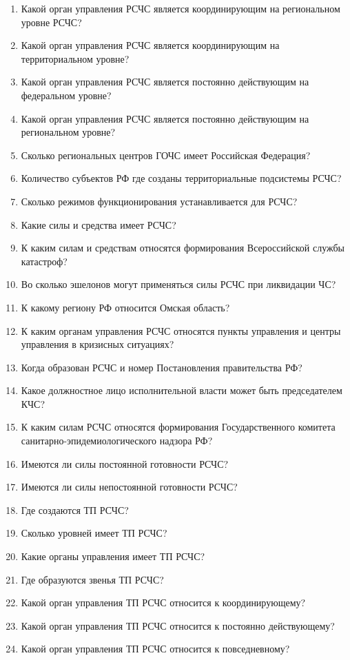 \documentclass[oneside,final,14pt]{extreport}
\begin{document}
\begin{enumerate}
	\item  Какой орган управления РСЧС является координирующим на региональном уровне РСЧС?
	\item  Какой орган управления РСЧС является координирующим на территориальном уровне?
	\item  Какой орган управления РСЧС является постоянно действующим на федеральном уровне?
	\item  Какой орган управления РСЧС является постоянно действующим на региональном уровне?
	\item  Сколько региональных центров ГОЧС имеет Российская Федерация?
	\item  Количество субъектов РФ где созданы территориальные подсистемы РСЧС?
	\item Сколько режимов функционирования устанавливается для РСЧС?
	\item  Какие силы и средства имеет РСЧС?
	\item  К каким силам и средствам относятся формирования Всероссийской службы катастроф?
	\item  Во сколько эшелонов могут применяться силы РСЧС при ликвидации ЧС?
	\item  К какому региону РФ относится Омская область?
	\item  К каким органам управления РСЧС относятся пункты управления и центры управления в кризисных ситуациях?
	\item  Когда образован РСЧС и номер Постановления правительства РФ?
	\item  Какое должностное лицо исполнительной власти может быть председателем КЧС?
	\item  К каким силам РСЧС относятся формирования Государственного комитета санитарно-эпидемиологического надзора РФ?
	\item  Имеются ли силы постоянной готовности РСЧС?
	\item Имеются ли силы непостоянной готовности РСЧС?
	\item  Где создаются ТП РСЧС?
	\item  Сколько уровней имеет ТП РСЧС?
	\item  Какие органы управления имеет ТП РСЧС?
	\item  Где образуются звенья ТП РСЧС?
	\item  Какой орган управления ТП РСЧС относится к координирующему?
	\item  Какой орган управления ТП РСЧС относится к постоянно действующему?
	\item  Какой орган управления ТП РСЧС относится к повседневному?

\end{enumerate}
\end{document}
